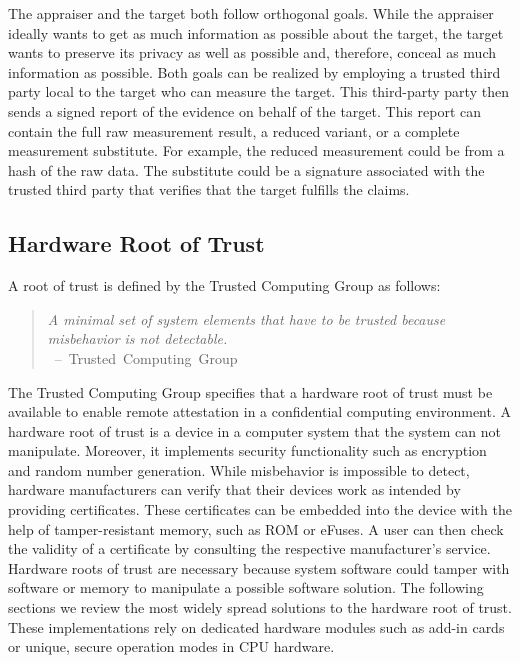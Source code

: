The appraiser and the target both follow orthogonal goals. While the appraiser
ideally wants to get as much information as possible about the target, the
target wants to preserve its privacy as well as possible and, therefore, conceal
as much information as possible. Both goals can be realized by employing a
trusted third party local to the target who can measure the target. This
third-party party then sends a signed report of the evidence on behalf of the
target. This report can contain the full raw measurement result, a reduced
variant, or a complete measurement substitute. For example, the reduced
measurement could be from a hash of the raw data. The substitute could be a
signature associated with the trusted third party that verifies that the target
fulfills the claims.

\subsection{Hardware Root of Trust}
\label{sec:20:hardware_root_of_trust}
A root of trust is defined by the Trusted Computing Group as follows:
\begin{quote}
  \textit{ A minimal set of system elements that have to be trusted because
    misbehavior is not detectable. \\
  } \mbox{ -- Trusted Computing Group\cite{tpm_architecture}}
\end{quote}

The Trusted Computing Group specifies that a hardware root of trust must be
available to enable remote attestation in a confidential computing
environment.\cite{tpm_architecture} A hardware root of trust is a device in a
computer system that the system can not manipulate. Moreover, it implements
security functionality such as encryption and random number generation. While
misbehavior is impossible to detect, hardware manufacturers can verify that
their devices work as intended by providing certificates. These certificates can
be embedded into the device with the help of tamper-resistant memory, such as
ROM or eFuses. A user can then check the validity of a certificate by consulting
the respective manufacturer's service. \\

Hardware roots of trust are necessary because system software could tamper with
software or memory to manipulate a possible software solution. The following
sections we review the most widely spread solutions to the hardware root of
trust. These implementations rely on dedicated hardware modules such as add-in
cards or unique, secure operation modes in CPU hardware. \\

